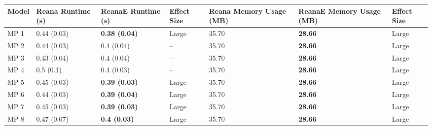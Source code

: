 \begin{tabular}{lllllll}
\toprule
Model & Reana Runtime (s) &    ReanaE Runtime (s) & Effect Size & Reana Memory Usage (MB) & ReanaE Memory Usage (MB) & Effect Size \\
\midrule
 MP 1 &       0.44 (0.03) &  \textbf{0.38 (0.04)} &       Large &                   35.70 &           \textbf{28.66} &       Large \\
 MP 2 &       0.44 (0.03) &            0.4 (0.04) &          -- &                   35.70 &           \textbf{28.66} &       Large \\
 MP 3 &       0.43 (0.04) &            0.4 (0.04) &          -- &                   35.70 &           \textbf{28.66} &       Large \\
 MP 4 &         0.5 (0.1) &            0.4 (0.03) &          -- &                   35.70 &           \textbf{28.66} &       Large \\
 MP 5 &       0.45 (0.03) &  \textbf{0.39 (0.03)} &       Large &                   35.70 &           \textbf{28.66} &       Large \\
 MP 6 &       0.44 (0.03) &  \textbf{0.39 (0.04)} &       Large &                   35.70 &           \textbf{28.66} &       Large \\
 MP 7 &       0.45 (0.03) &  \textbf{0.39 (0.03)} &       Large &                   35.70 &           \textbf{28.66} &       Large \\
 MP 8 &       0.47 (0.07) &   \textbf{0.4 (0.03)} &       Large &                   35.70 &           \textbf{28.66} &       Large \\
\bottomrule
\end{tabular}
